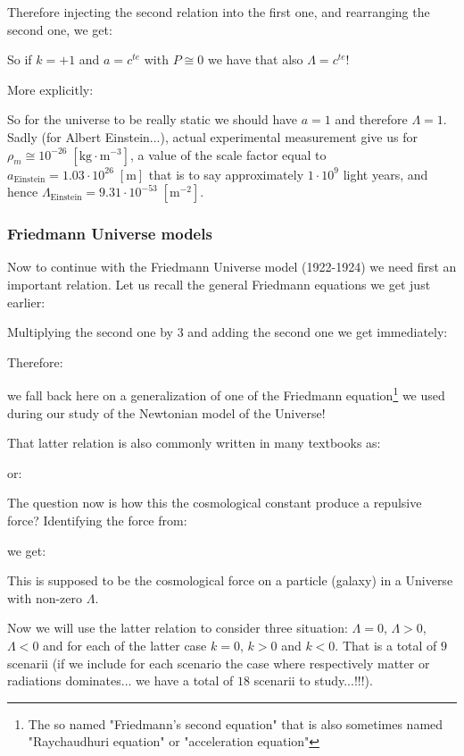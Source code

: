 	Therefore injecting the second relation into the first one, and rearranging the second one, we get:
	
	So if $k=+1$ and $a=c^{te}$ with $P\cong 0$ we have that also $\Lambda = c^{te}$!
	
	More explicitly:
	
	So for the universe to be really static we should have $a=1$ and therefore $\Lambda=1$. Sadly (for Albert Einstein...), actual experimental measurement give us for $\rho_m\cong 10^{-26}\;[\text{kg}\cdot\text{m}^{-3}]$, a value of the scale factor equal to $a_\text{Einstein}=1.03\cdot 10^{26}\;[\text{m}]$ that is to say approximately $1\cdot 10^9$ light years, and hence $\Lambda_\text{Einstein}=9.31\cdot 10^{-53}\;[\text{m}^{-2}]$.
	
	\subsubsection{Friedmann Universe models}
	Now to continue with the Friedmann Universe model (1922-1924) we need first an important relation. Let us recall the general Friedmann equations we get just earlier:
	
	Multiplying the second one by $3$ and adding the second one we get immediately:
	
	Therefore:
	
	we fall back here on a generalization of one of the Friedmann equation\footnote{The so named "Friedmann's second equation" that is also sometimes named "Raychaudhuri equation" or "acceleration equation"} we used during our study of the Newtonian model of the Universe!
	
	That latter relation is also commonly written in many textbooks as:
	
	or:
	

	\begin{tcolorbox}[title=Remark,colframe=black,arc=10pt]
	The question now is how this the cosmological constant produce a repulsive force? Identifying the force from:
	
	we get\label{cosmological repuslive force}:
	
	This is supposed to be the cosmological force on a particle (galaxy) in a Universe with non-zero $\Lambda$.
	\end{tcolorbox}
				
	Now we will use the latter relation to consider three situation: $\Lambda=0$, $\Lambda>0$, $\Lambda<0$ and for each of the latter case $k=0$, $k>0$ and $k<0$. That is a total of $9$ scenarii (if we include for each scenario the case where respectively matter or radiations dominates... we have a total of $18$ scenarii to study...!!!).

